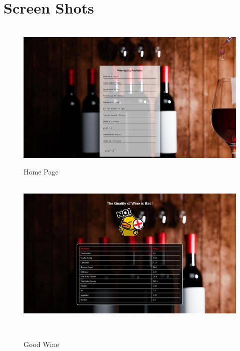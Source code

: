 \documentclass[a4paper, 12pt]{report}
\begin{document}
\section{Screen Shots }
\begin{figure}[h]
\centering
\\
\includegraphics[width=1\linewidth, frame]{SS/H.jpg}
\linebreak
\caption{Home Page}
\linebreak
\\
\includegraphics[width=1\linewidth, frame]{SS/B.jpg}
\linebreak
\caption{Good Wine}
\\
\end{figure}
\end{document}
